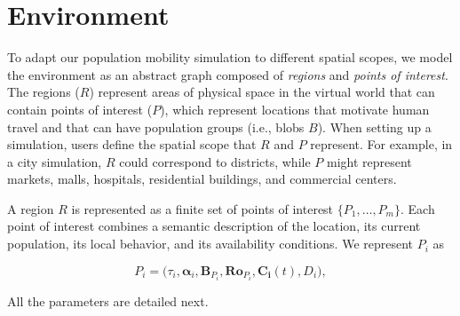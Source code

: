\section{Environment}
\label{sec:environment}

To adapt our population mobility simulation to different spatial scopes, we model the environment as an abstract graph composed of \textit{regions} and \textit{points of interest}. The regions ($R$) represent areas of physical space in the virtual world that can contain points of interest ($P$), which represent locations that motivate human travel and that can have population groups (i.e., blobs $B$).
When setting up a simulation, users define the spatial scope that $R$ and $P$ represent. For example, in a city simulation, $R$ could correspond to districts, while $P$ might represent markets, malls, hospitals, residential buildings, and commercial centers.


A region $R$ is represented as a finite set of points of interest $\{P_1,\ldots,P_m\}$. Each point of interest combines a semantic description of the location, its current population, its local behavior, and its availability conditions. We represent $P_i$ as

\begin{equation}
P_i=\bigl(\tau_i,\bm{\alpha}_i,\bm{B}_{P_i},\bm{Ro}_{P_i},\bm{C_i}(t),D_i\bigr),
\label{eq:poi_definition}
\end{equation}

All the parameters are detailed next. %




